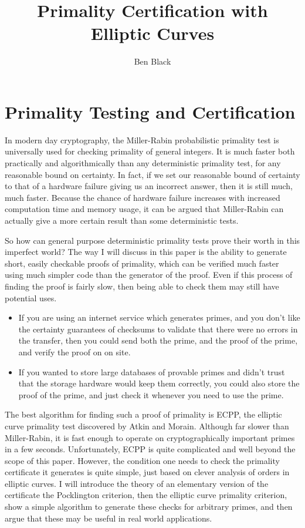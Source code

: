 \documentclass[]{article}
\title{Primality Certification with Elliptic Curves}
\author{Ben Black}
\begin{document}
\lstset{language=Python}

\maketitle

\section{Primality Testing and Certification}

In modern day cryptography, the Miller-Rabin probabilistic primality test is universally used for checking primality of general integers. It is much faster both practically and algorithmically than any deterministic primality test, for any reasonable bound on certainty. In fact, if we set our reasonable bound of certainty to that of a hardware failure giving us an incorrect answer, then it is still much, much faster. Because the chance of hardware failure increases with increased computation time and memory usage, it can be argued that Miller-Rabin can actually give a more certain result than some deterministic tests.

So how can general purpose deterministic primality tests prove their worth in this imperfect world? The way I will discuss in this paper is the ability to generate short, easily checkable proofs of primality, which can be verified much faster using much simpler code than the generator of the proof. Even if this process of finding the proof is fairly slow, then being able to check them may still have potential uses.

\begin{itemize}
	\item If you are using an internet service which generates primes, and you don't like the certainty guarantees of checksums to validate that there were no errors in the transfer, then you could send both the prime, and the proof of the prime, and verify the proof on on site.
	\item If you wanted to store large databases of provable primes and didn't trust that the storage hardware would keep them correctly, you could also store the proof of the prime, and just check it whenever you need to use the prime.
\end{itemize}

The best algorithm for finding such a proof of primality is ECPP, the elliptic curve primality test discovered by Atkin and Morain. Although far slower than Miller-Rabin, it is fast enough to operate on cryptographically important primes in a few seconds. Unfortunately, ECPP is quite complicated and well beyond the scope of this paper. However, the condition one needs to check the primality certificate it generates is quite simple, just based on clever analysis of orders in elliptic curves. I will introduce the theory of an elementary version of the certificate the Pocklington criterion, then the elliptic curve primality criterion, show a simple algorithm to generate these checks for arbitrary primes, and then argue that these may be useful in real world applications.
\end{document}
